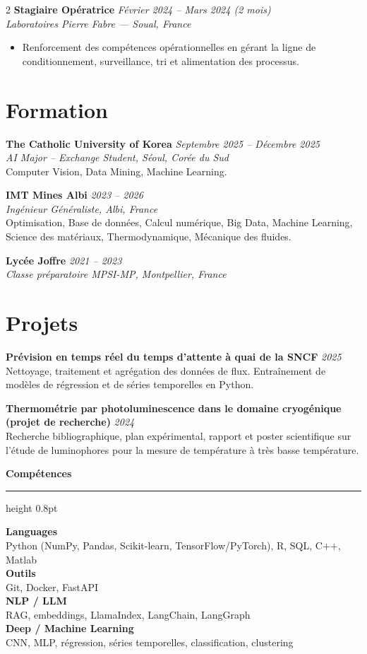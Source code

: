 \documentclass[10.5pt,a4paper]{article}
\newcommand{\sectionrule}{\vspace{-6pt}{\color{accent}\hrule height 1pt}\vspace{3pt}}
\newcommand{\subsectitle}[1]{%
  {\color{accent}\bfseries\large #1}\\[-2pt]
  {\color{accent}\hrule height 0.8pt}\vspace{4pt}
}
\newcommand{\cvexp}[5]{%
  \noindent\textbf{#1} \hfill {\itshape\color{graytext}\small #4}\\
  {\itshape #2 --- #3}\\[-2pt]
  #5
  \vspace{10pt}
}
\newcommand{\cvedu}[5]{%
  \noindent\textbf{#1} \hfill {\itshape\color{graytext}\small #4}\\
  {\itshape #2, #3}\\[1pt]
  {\small #5}
  \vspace{2pt}
}
\newcommand{\cveduplain}[4]{%
  \noindent\textbf{#1} \hfill {\itshape\color{graytext}\small #4}\\
  {\itshape #2, #3}
  \vspace{2pt}
}
\newcommand{\cvproject}[3]{%
  \noindent\textbf{#1} \hfill {\itshape\color{graytext}\small #2}\\[1pt]
  {\small #3}
  \vspace{3pt}
}
\newcommand{\sidebarline}[2]{%
  \noindent\textbf{\small #1}\\
  {\small #2}\\[3pt]
}
\begin{document}
\begin{paracol}{2}
\cvexp{Stagiaire Opératrice}{Laboratoires Pierre Fabre}{Soual, France}{Février 2024 -- Mars 2024 (2 mois)}{%
  \begin{itemize}[leftmargin=12pt, itemsep=2pt, topsep=0pt, partopsep=0pt, parsep=0pt]
    \item Renforcement des compétences opérationnelles en gérant la ligne de conditionnement, surveillance, tri et alimentation des processus.
  \end{itemize}
}

\section*{Formation}
\sectionrule

\cvedu{The Catholic University of Korea}{AI Major -- Exchange Student}{Séoul, Corée du Sud}{Septembre 2025 -- Décembre 2025}{Computer Vision, Data Mining, Machine Learning.}

\cvedu{IMT Mines Albi}{Ingénieur Généraliste}{Albi, France}{2023 -- 2026}{Optimisation, Base de données, Calcul numérique, Big Data, Machine Learning, Science des matériaux, Thermodynamique, Mécanique des fluides.}

\cveduplain{Lycée Joffre}{Classe préparatoire MPSI-MP}{Montpellier, France}{2021 -- 2023}

\section*{Projets}
\sectionrule

\cvproject{Prévision en temps réel du temps d'attente à quai de la SNCF}{2025}{Nettoyage, traitement et agrégation des données de flux. Entraînement de modèles de régression et de séries temporelles en Python.}

\cvproject{Thermométrie par photoluminescence dans le domaine cryogénique (projet de recherche)}{2024}{Recherche bibliographique, plan expérimental, rapport et poster scientifique sur l'étude de luminophores pour la mesure de température à très basse température.}

\switchcolumn

\vspace{2pt}

\subsectitle{Compétences}

\sidebarline{Languages}{Python (NumPy, Pandas, Scikit-learn, TensorFlow/\allowbreak PyTorch), R, SQL, C++, Matlab}
\sidebarline{Outils}{Git, Docker, FastAPI}
\sidebarline{NLP / LLM}{RAG, embeddings, LlamaIndex, LangChain, LangGraph}
\sidebarline{Deep / Machine Learning}{CNN, MLP, régression, séries temporelles, classification, clustering}


\end{paracol}
\end{document}
